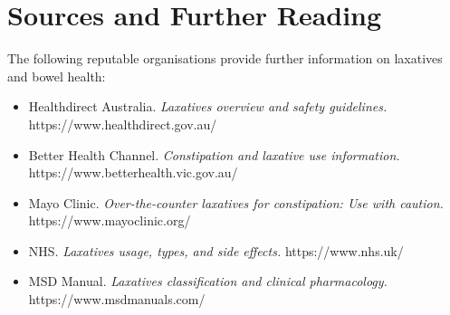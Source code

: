 \section*{Sources and Further Reading}
The following reputable organisations provide further information on laxatives and bowel health:
\begin{itemize}
    \item Healthdirect Australia. \textit{Laxatives overview and safety guidelines.} https://www.healthdirect.gov.au/
    \item Better Health Channel. \textit{Constipation and laxative use information.} https://www.betterhealth.vic.gov.au/
    \item Mayo Clinic. \textit{Over-the-counter laxatives for constipation: Use with caution.} https://www.mayoclinic.org/
    \item NHS. \textit{Laxatives usage, types, and side effects.} https://www.nhs.uk/
    \item MSD Manual. \textit{Laxatives classification and clinical pharmacology.} https://www.msdmanuals.com/
\end{itemize}
